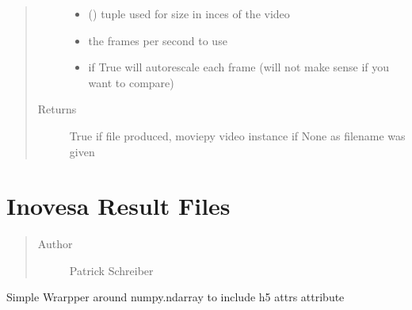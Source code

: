 \documentclass[letterpaper,10pt,openany,oneside,english]{sphinxmanual}
\begin{document}
\begin{fulllineitems}
\begin{fulllineitems}
\begin{quote}
\begin{description}
\begin{itemize}
\item {} 
\sphinxstyleliteralstrong{)} (\sphinxstyleliteralemphasis{(}\sphinxstyleliteralemphasis{,}) \textendash{} tuple used for size in inces of the video

\item {} 
\sphinxstyleliteralstrong{(}\sphinxstyleliteralstrong{)} \textendash{} the frames per second to use

\item {} 
\sphinxstyleliteralstrong{(}\sphinxstyleliteralstrong{)} \textendash{} if True will autorescale each frame (will not make sense if you want to compare)

\end{itemize}

\item[{Returns}] \leavevmode
True if file produced, moviepy video instance if None as filename was given

\end{description}\end{quote}

\end{fulllineitems}


\end{fulllineitems}

\label{\detokenize{file:module-file}}

\chapter{Inovesa Result Files}
\label{\detokenize{file::doc}}\label{\detokenize{file:inovesa-result-files}}\label{\detokenize{file:file}}\begin{quote}\begin{description}
\item[{Author}] \leavevmode
Patrick Schreiber

\end{description}\end{quote}

\begin{fulllineitems}
\label{\detokenize{file:file.AttributedNPArray}}
Simple Wrarpper around numpy.ndarray to include h5 attrs attribute

\end{fulllineitems}
\end{document}
